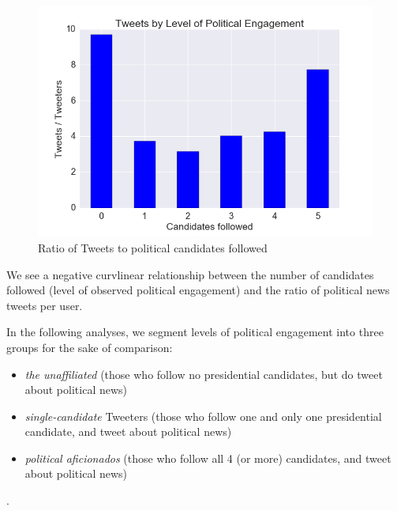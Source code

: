 \begin{figure}[H]  
\centering 
  \includegraphics[width=1.0\textwidth]{tweets-by-candid-ct}  
  \caption{Ratio of Tweets to political candidates followed
    \label{fig:candid-ct}}
\end{figure}

We see a negative curvlinear relationship between the number of candidates followed (level of observed political engagement) and the ratio of political news tweets per user.


In the following analyses, we segment levels of political engagement into three groups for the sake of comparison:

\begin{itemize}
  \item \emph{the unaffiliated} (those who follow no presidential candidates, but do tweet about political news)
  \item \emph{single-candidate} Tweeters (those who follow one and only one presidential candidate, and tweet about political news)
  \item \emph{political aficionados} (those who follow all 4 (or more) candidates, and tweet about political news)
\end{itemize}.
















